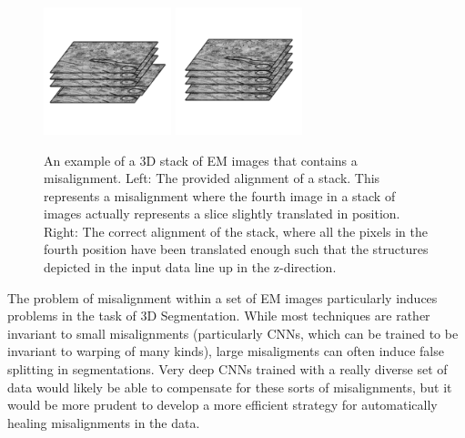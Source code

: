 \begin{figure}[h]
    \centering
	\includegraphics[width=0.33\textwidth]{img/misalignment_example}
	\hspace{1cm}
	\includegraphics[width=0.33\textwidth]{img/alignment_example}
    \caption{An example of a 3D stack of EM images that contains a misalignment. Left: The provided alignment of a stack. This represents a misalignment where the fourth image in a stack of images actually represents a slice slightly translated in position. Right: The correct alignment of the stack, where all the pixels in the fourth position have been translated enough such that the structures depicted in the input data line up in the z-direction.}
    \label{fig:misalignment_example}
\end{figure}

The problem of misalignment within a set of EM images particularly induces problems in the task of 3D Segmentation. While most techniques are rather invariant to small misalignments (particularly CNNs, which can be trained to be invariant to warping of many kinds), large misaligments can often induce false splitting in segmentations. Very deep CNNs trained with a really diverse set of data would likely be able to compensate for these sorts of misalignments, but it would be more prudent to develop a more efficient strategy for automatically healing misalignments in the data. 

